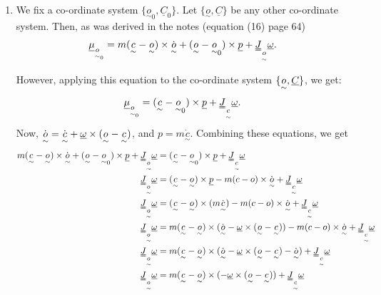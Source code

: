 \documentclass[11pt]{article}
\newcommand{\utilde}[1]{\underset{\sim}{#1}}
\begin{document}
\begin{enumerate}
    \item[(a)] We fix a co-ordinate system $\{\utilde{o}_0, \underline{C}_0\}$.
        Let $\{\utilde{o}, \underline{C}\}$ be any other co-ordinate system.
        Then, as was derived in the notes (equation (16) page 64)
        \begin{align*}
            \underline{\mu}_{\utilde{o}_{0}} &=  m(\utilde{c} - \utilde{o}) \times  \dot{\utilde{o}} + (\utilde{o} - \utilde{o}_0) \times \underline{p} + \uuline{J}_{\utilde{o}} \uline{\omega}
        .\end{align*}

        However, applying this equation to the co-ordinate system $\{\utilde{o}, \uline{C}\} $, we get:
        \begin{align*}
            \underline{\mu}_{\utilde{o}_{0}} &=   (\utilde{c} - \utilde{o}_0) \times \underline{p} + \uuline{J}_{\utilde{c}} \uline{\omega}
        .\end{align*}
        Now, $\dot{\utilde{o}} = \dot{\utilde{c}} + \uline{\omega} \times (\utilde{o} - \utilde{c})$, and $p = m \dot{\utilde{c}}$.
        Combining these equations, we get
        \begin{align*}
            m(\utilde{c} - \utilde{o}) \times  \dot{\utilde{o}} + (\utilde{o} - \utilde{o}_0) \times \underline{p} + \uuline{J}_{\utilde{o}} \uline{\omega}
            &= (\utilde{c} - \utilde{o}_0) \times \underline{p} + \uuline{J}_{\utilde{c}} \uline{\omega}\\
            \uuline{J}_{\utilde{o}} \uline{\omega} &= (\utilde{c} - \utilde{o}) \times \uline{p} - m(c - o) \times \dot{\utilde{o}} + \uuline{J}_{\utilde{c}}\underline{\omega}\\
            \uuline{J}_{\utilde{o}} \uline{\omega} &= (\utilde{c} - \utilde{o}) \times (m \dot{\utilde{c}}) - m(c - o) \times \dot{\utilde{o}} + \uuline{J}_{\utilde{c}}\underline{\omega}\\
            \uuline{J}_{\utilde{o}} \uline{\omega} &= m(\utilde{c} - \utilde{o}) \times (\dot{\utilde{o}} - \uline{\omega} \times  (\utilde{o} - \utilde{c})) - m(c - o) \times \dot{\utilde{o}} + \uuline{J}_{\utilde{c}}\underline{\omega}\\
            \uuline{J}_{\utilde{o}} \uline{\omega} &= m(\utilde{c} - \utilde{o}) \times (\dot{\utilde{o}} - \uline{\omega} \times  (\utilde{o} - \utilde{c}) - \dot{\utilde{o}}) + \uuline{J}_{\utilde{c}}\underline{\omega}\\
            \uuline{J}_{\utilde{o}} \uline{\omega} &= m(\utilde{c} - \utilde{o}) \times ( - \uline{\omega} \times  (\utilde{o} - \utilde{c})) + \uuline{J}_{\utilde{c}}\underline{\omega}\\

\end{align*}
\end{enumerate}
\end{document}
